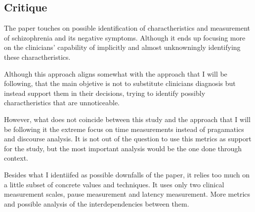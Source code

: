 \documentclass{Paper_Summary}
\begin{document}
\makepapertitle

\breakline

\begin{center}
    \section*{Critique}
\end{center}
    
    The paper touches on possible identification of charactheristics and measurement of schizophrenia and its negative symptoms. Although it ends up focusing more on the clinicians' capability of implicitly and almost unknowningly identifying these charactheristics.

    Although this approach aligns somewhat with the approach that I will be following, that the main objetive is not to substitute clinicians diagnosis but instead support them in their decisions, trying to identify possibly charactheristics that are unnoticeable.

    However, what does not coincide between this study and the approach that I will be following it the extreme focus on time measurements instead of pragamatics and discourse analysis. It is not out of the question to use this metrics as support for the study, but the most important analysis would be the one done through context.

    Besides what I identiifed as possible downfalls of the paper, it relies too much on a little subset of concrete values and techniques. It uses only two clinical measurement scales, pause measurement and latency measurement. More metrics and possible analysis of the interdependencies between them.

\breakline
\end{document}
